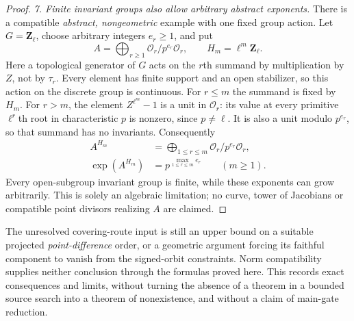 \begin{proof}
\emph{7. Finite invariant groups also allow arbitrary abstract exponents.}
There is a compatible \emph{abstract, nongeometric} example
with one fixed group action. Let $G=\mathbf Z_\ell$, choose
arbitrary integers $e_r\ge1$, and put
\[
 A=\bigoplus_{r\ge1}\mathcal O_r/p^{e_r}\mathcal O_r,
 \qquad H_m=\ell^m\mathbf Z_\ell.
       \tag{NC.16}
\]
Here a topological generator of $G$ acts on the $r$th
summand by multiplication by $Z$, not by $\tau_r$.
Every element has finite support and an open stabilizer,
so this action on the discrete group is continuous.
For $r\le m$ the summand is fixed by $H_m$.
For $r>m$, the element $Z^{\ell^m}-1$ is a unit in
$\mathcal O_r$: its value at every primitive $\ell^r$th
root in characteristic $p$ is nonzero, since $p\ne\ell$.
It is also a unit modulo $p^{e_r}$, so that summand has no
invariants. Consequently
\[
\begin{aligned}
 A^{H_m}&=\bigoplus_{1\le r\le m}
                 \mathcal O_r/p^{e_r}\mathcal O_r,\\
 \exp(A^{H_m})&=p^{\max_{1\le r\le m}e_r}\qquad(m\ge1).
\end{aligned}
       \tag{NC.17}
\]
Every open-subgroup invariant group is finite, while these
exponents can grow arbitrarily. This is solely an algebraic
limitation; no curve, tower of Jacobians or compatible point
divisors realizing $A$ are claimed.
\end{proof}

The unresolved covering-route input is still an upper bound
on a suitable projected \emph{point-difference} order, or a
geometric argument forcing its faithful component to vanish
from the signed-orbit constraints. Norm compatibility supplies
neither conclusion through the formulas proved here. This
records exact consequences and limits, without turning the
absence of a theorem in a bounded source search into a theorem
of nonexistence, and without a claim of main-gate reduction.
